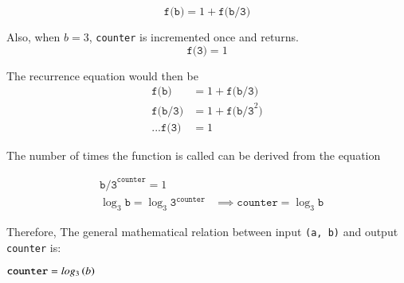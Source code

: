 \documentclass[journal,12pt,twocolumn]{IEEEtran}
\begin{document}
\begin{equation}
    \texttt{f(b)} = 1 + \texttt{f(b/3)}
\end{equation}

Also, when $b = 3$, \texttt{counter} is incremented once and returns.
\begin{equation}
    \texttt{f(3)} = 1 
\end{equation}

The recurrence equation would then be
\begin{align}
    \texttt{f(b)} &= 1 + \texttt{f(b/3)} \\
    \texttt{f(b/3)} &= 1 + \texttt{f(b/3}^2\texttt{)} \\
    ...     \texttt{f(3)} &= 1
\end{align}

The number of times the function is called can be derived from the equation

\begin{align}
   & \texttt{b/3}^\texttt{counter} = 1 \\
   &\log_3{\texttt{b}} = \log_3{\texttt{3}^\texttt{counter}} & \implies \texttt{counter} = \log_3{\texttt{b}}
\end{align}

Therefore, The general mathematical relation between input \texttt{(a, b)} and output \texttt{counter} is:

$\texttt{counter} = log_3\left(b\right)$
\end{document}
